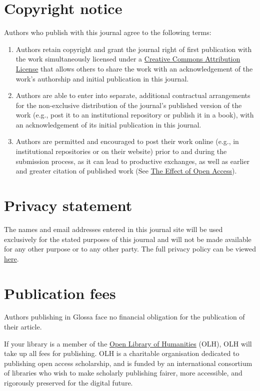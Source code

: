\documentclass[charis,linguex]{glossa}
\begin{document}
\section{Copyright notice}

Authors who publish with this journal agree to the following terms:

\begin{enumerate}[label=\arabic*.]
\item Authors retain copyright and grant the journal right of first publication with the work simultaneously licensed under a \href{http://creativecommons.org/licenses/by/3.0/}{Creative Commons Attribution License} that allows others to share the work with an acknowledgement of the work's authorship and initial publication in this journal.
\item Authors are able to enter into separate, additional contractual arrangements for the non-exclusive distribution of the journal's published version of the work (e.g., post it to an institutional repository or publish it in a book), with an acknowledgement of its initial publication in this journal.
\item Authors are permitted and encouraged to post their work online (e.g., in institutional repositories or on their website) prior to and during the submission process, as it can lead to productive exchanges, as well as earlier and greater citation of published work (See \href{http://opcit.eprints.org/oacitation-biblio.html}{The Effect of Open Access}).
\end{enumerate}

\section{Privacy statement}

The names and email addresses entered in this journal site will be used exclusively for the stated purposes of this journal and will not be made available for any other purpose or to any other party. The full privacy policy can be viewed \href{https://www.glossa-journal.org/about/privacy-policy/}{here}.

\section{Publication fees}

Authors publishing in Glossa face no financial obligation for the publication of their article. 

If your library is a member of the \href{https://www.openlibhums.org}{Open Library of Humanities} (OLH), OLH will take up all fees for publishing. OLH is a charitable organisation dedicated to publishing open access scholarship, and is funded by an international consortium of libraries who wish to make scholarly publishing fairer, more accessible, and rigorously preserved for the digital future.
\end{document}
